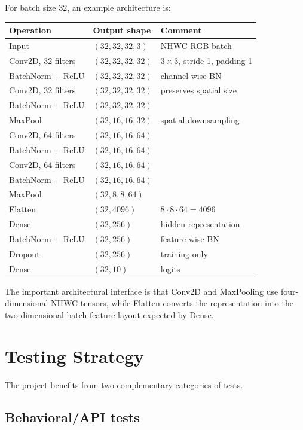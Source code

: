 \documentclass[11pt,a4paper]{article}
\begin{document}
For batch size $32$, an example architecture is:
\begin{longtable}{lll}
\toprule
Operation & Output shape & Comment\\
\midrule
Input & $(32,32,32,3)$ & NHWC RGB batch\\
Conv2D, 32 filters & $(32,32,32,32)$ & $3\times3$, stride 1, padding 1\\
BatchNorm + ReLU & $(32,32,32,32)$ & channel-wise BN\\
Conv2D, 32 filters & $(32,32,32,32)$ & preserves spatial size\\
BatchNorm + ReLU & $(32,32,32,32)$ & \\
MaxPool & $(32,16,16,32)$ & spatial downsampling\\
Conv2D, 64 filters & $(32,16,16,64)$ & \\
BatchNorm + ReLU & $(32,16,16,64)$ & \\
Conv2D, 64 filters & $(32,16,16,64)$ & \\
BatchNorm + ReLU & $(32,16,16,64)$ & \\
MaxPool & $(32,8,8,64)$ & \\
Flatten & $(32,4096)$ & $8\cdot8\cdot64=4096$\\
Dense & $(32,256)$ & hidden representation\\
BatchNorm + ReLU & $(32,256)$ & feature-wise BN\\
Dropout & $(32,256)$ & training only\\
Dense & $(32,10)$ & logits\\
\bottomrule
\end{longtable}

The important architectural interface is that Conv2D and MaxPooling use four-dimensional NHWC tensors, while Flatten converts the representation into the two-dimensional batch-feature layout expected by Dense.

\section{Testing Strategy}

The project benefits from two complementary categories of tests.

\subsection{Behavioral/API tests}
\end{document}
